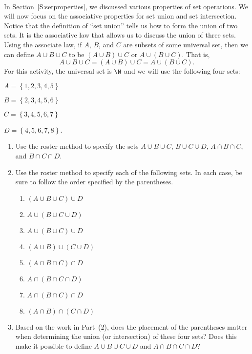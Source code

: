 \begin{previewactivity} \label{PA:foursets} \hfill
\\
In Section~\ref{S:setproperties}, we discussed various properties of set operations.  We will now focus on the associative properties for set union  and set intersection.  Notice that the definition of ``set union'' tells us how to form the union of two sets.  It is the associative law that allows us to discuss the union of three sets.  Using the associate law, if $A$, $B$, and $C$ are subsets of some universal set, then we can define $A \cup B \cup C$ to be 
$\left( A \cup B \right) \cup C$ or $A \cup \left( B \cup C \right)$.  That is,
\[
A \cup B \cup C = \left(A \cup B \right) \cup C = A \cup \left( B \cup C \right)\!.
\]
For this activity, the universal set is $\N$ and we will use the following four sets:
\begin{multicols}{2}

$A = \left\{ 1, 2, 3, 4, 5 \right\}$

$B = \left\{ 2, 3, 4, 5, 6 \right\}$

$C = \left\{ 3, 4, 5, 6, 7 \right\}$

$D = \left\{ 4, 5, 6, 7, 8 \right\}$.
\end{multicols}

\begin{enumerate}
\item Use the roster method to specify the sets $A \cup B \cup C$, $B \cup C \cup D$, 
$A \cap B \cap C$, and  $B \cap C \cap D$.

\item Use the roster method to specify each of the following sets.  In each case, be sure to follow the order specified by the parentheses.
\begin{multicols}{2}
\begin{enumerate}
\item $\left( A \cup B \cup C \right) \cup D$
\item $A \cup \left( B \cup C \cup D \right)$
\item $A \cup \left( B \cup C \right) \cup D$
\item $\left( A \cup B \right) \cup \left( C \cup D \right)$
\item $\left( A \cap B \cap C \right) \cap D$
\item $A \cap \left( B \cap C \cap D \right)$
\item $A \cap \left( B \cap C \right) \cap D$
\item $\left( A \cap B \right) \cap \left( C \cap D \right)$
\end{enumerate}
\end{multicols}
\item Based on the work in Part~(2), does the placement of the parentheses matter when determining the union (or intersection) of these four sets?  Does this make it possible to define $A \cup B \cup C \cup D$ and $A \cap B \cap C \cap D$?
\end{enumerate}



\end{previewactivity}
